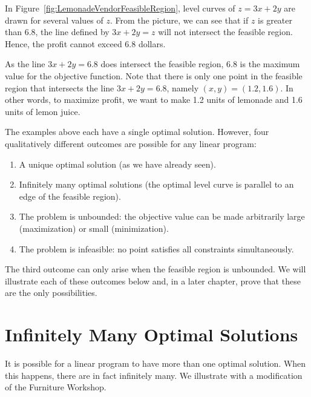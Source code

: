\begin{solution}
In Figure~\ref{fig:LemonadeVendorFeasibleRegion}, level curves of \(z = 3x+2y\) are
drawn for several values of \(z\). From the picture, we can see that if \(z\) is greater than 6.8,
the line defined by \(3x+2y = z\) will not intersect the feasible
region. Hence, the profit cannot exceed 6.8 dollars.

As the line \(3x+2y = 6.8\) does intersect the feasible region, \(6.8\)
is the maximum value for the objective function. Note that there is only
one point in the feasible region that intersects the line \(3x+2y=6.8\),
namely $(x,y) = (1.2,1.6)$.
In other words, to maximize profit, we want to make 1.2 units of
lemonade and 1.6 units of lemon juice.
\end{solution}

The examples above each have a single optimal solution. However, four qualitatively different outcomes are possible for any linear program:
\begin{enumerate}[nosep]
\item A unique optimal solution (as we have already seen).
\item Infinitely many optimal solutions (the optimal level curve is parallel to an edge of the feasible region).
\item The problem is unbounded: the objective value can be made arbitrarily large (maximization) or small (minimization).
\item The problem is infeasible: no point satisfies all constraints simultaneously.
\end{enumerate}

The third outcome can only arise when the feasible region is unbounded. We will illustrate each of these outcomes below and, in a later chapter, prove that these are the only possibilities.

\section{Infinitely Many Optimal Solutions}\label{sec:infinitely-many-optima}

It is possible for a linear program to have more than one optimal solution. When this happens, there are in fact infinitely many.  We illustrate with a modification of the Furniture Workshop.


